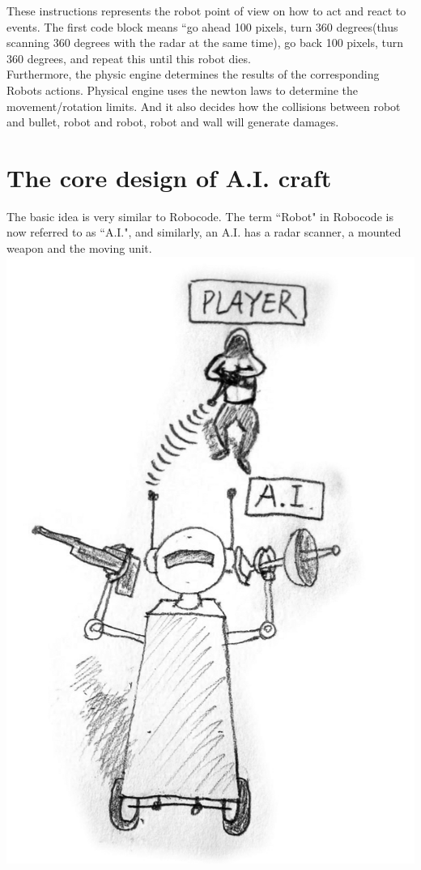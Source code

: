 \documentclass[12pt]{article}
\begin{document}
These instructions represents the robot point of view on how to act and react to events. The first code block means ``go ahead 100 pixels, turn 360 degrees(thus scanning 360 degrees with the radar at the same time), go back 100 pixels, turn 360 degrees, and repeat this until this robot dies.\\ 

Furthermore, the physic engine determines the results of the corresponding Robots actions. Physical engine uses the newton laws to determine the movement/rotation limits. And it also decides how the collisions between robot and bullet, robot and robot, robot and wall will generate damages.\\

\section{The core design of A.I. craft}
The basic idea is very similar to Robocode. The term ``Robot" in Robocode is now referred to as ``A.I.", and similarly, an A.I. has a radar scanner, a mounted weapon and the moving unit.\\ 

\includegraphics[scale=0.3]{design_draft_1.jpg}\\
\end{document}
